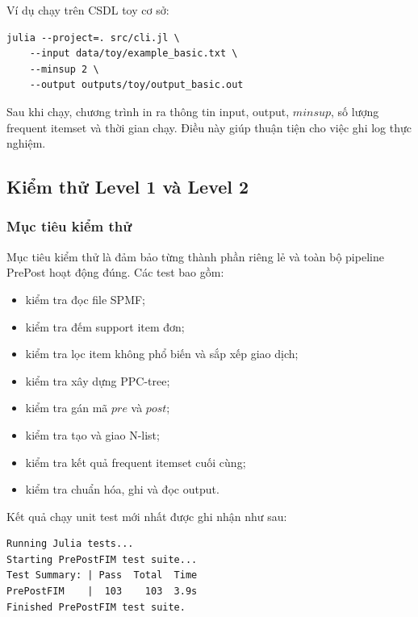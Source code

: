 Ví dụ chạy trên CSDL toy cơ sở:

\begin{lstlisting}[caption={Ví dụ chạy chương trình trên CSDL toy}, label={lst:cli-example}]
julia --project=. src/cli.jl \
    --input data/toy/example_basic.txt \
    --minsup 2 \
    --output outputs/toy/output_basic.out
\end{lstlisting}

Sau khi chạy, chương trình in ra thông tin input, output, $\mathit{minsup}$, số lượng frequent itemset và thời gian chạy. Điều này giúp thuận tiện cho việc ghi log thực nghiệm.

\subsection{Kiểm thử Level 1 và Level 2}
\label{subsec:level1-level2-tests}

\subsubsection{Mục tiêu kiểm thử}

Mục tiêu kiểm thử là đảm bảo từng thành phần riêng lẻ và toàn bộ pipeline PrePost hoạt động đúng. Các test bao gồm:

\begin{itemize}
    \item kiểm tra đọc file SPMF;
    \item kiểm tra đếm support item đơn;
    \item kiểm tra lọc item không phổ biến và sắp xếp giao dịch;
    \item kiểm tra xây dựng PPC-tree;
    \item kiểm tra gán mã $pre$ và $post$;
    \item kiểm tra tạo và giao N-list;
    \item kiểm tra kết quả frequent itemset cuối cùng;
    \item kiểm tra chuẩn hóa, ghi và đọc output.
\end{itemize}

Kết quả chạy unit test mới nhất được ghi nhận như sau:

\begin{lstlisting}[caption={Kết quả chạy unit test}, label={lst:unit-test-log}]
Running Julia tests...
Starting PrePostFIM test suite...
Test Summary: | Pass  Total  Time
PrePostFIM    |  103    103  3.9s
Finished PrePostFIM test suite.
\end{lstlisting}

